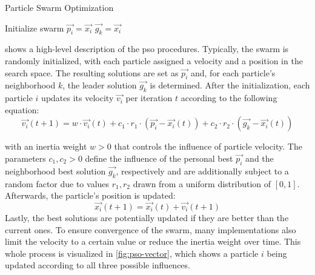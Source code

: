 \begin{algorithm}
	\caption{Particle Swarm Optimization}
	\label{alg:pso}
	\begin{algorithmic}
		\State Initialize swarm
		\Repeat
		\State {}
		\State {}
		 {$\vec{p_i} = \vec{x_i}$}
		 {$\vec{g_k} = \vec{x_i}$}\EndIf \EndIf
		\EndFor
	\end{algorithmic}
\end{algorithm}

 shows a high-level description of the \gls{pso} procedures. Typically, the swarm is randomly initialized, with each particle assigned a velocity and a position in the search space. The resulting solutions are set as $\vec{p_i}$ and, for each particle's neighborhood $k$, the leader solution $\vec{g_k}$ is determined. After the initialization, each particle $i$ updates its velocity $\vec{v_i}$ per iteration $t$ according to the following equation:
\begin{equation}
	\vec{v_i}(t+1) = w \cdot \vec{v_i}(t) + c_1 \cdot r_1 \cdot (\vec{p_i} - \vec{x_i}(t)) + c_2 \cdot r_2 \cdot (\vec{g_k} - \vec{x_i}(t))
\end{equation}

with an inertia weight $w > 0$ that controls the influence of particle velocity. The parameters $c_1, c_2 > 0$ define the influence of the personal best $\vec{p_i}$ and the neighborhood best solution $\vec{g_k}$, respectively and are additionally subject to a random factor due to values $r_1, r_2$ drawn from a uniform distribution of $[0,1]$. Afterwards, the particle's position is updated: 
\begin{equation}
	\vec{x_i}(t+1) = \vec{x_i}(t) + \vec{v_i}(t+1)
\end{equation}  
Lastly, the best solutions are potentially updated if they are better than the current ones. To ensure convergence of the swarm, many implementations also limit the velocity to a certain value or reduce the inertia weight over time.
This whole process is visualized in \cref{fig:pso-vector}, which shows a particle $i$ being updated according to all three possible influences. 

